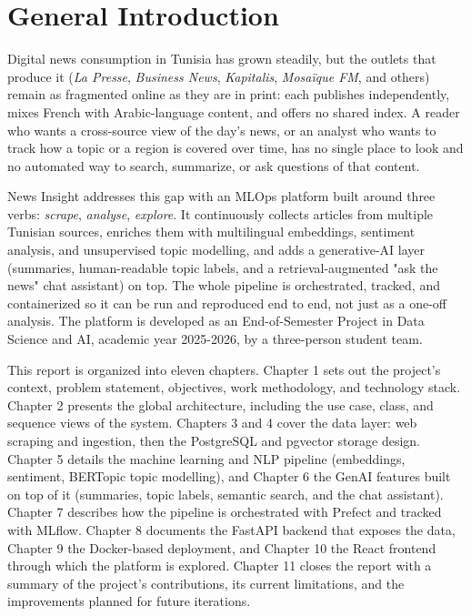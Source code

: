 \chapter*{General Introduction}

Digital news consumption in Tunisia has grown steadily, but the outlets that produce it (\textit{La Presse}, \textit{Business News}, \textit{Kapitalis}, \textit{Mosaïque FM}, and others) remain as fragmented online as they are in print: each publishes independently, mixes French with Arabic-language content, and offers no shared index. A reader who wants a cross-source view of the day's news, or an analyst who wants to track how a topic or a region is covered over time, has no single place to look and no automated way to search, summarize, or ask questions of that content.

News Insight addresses this gap with an MLOps platform built around three verbs: \emph{scrape}, \emph{analyse}, \emph{explore}. It continuously collects articles from multiple Tunisian sources, enriches them with multilingual embeddings, sentiment analysis, and unsupervised topic modelling, and adds a generative-AI layer (summaries, human-readable topic labels, and a retrieval-augmented "ask the news" chat assistant) on top. The whole pipeline is orchestrated, tracked, and containerized so it can be run and reproduced end to end, not just as a one-off analysis. The platform is developed as an End-of-Semester Project in Data Science and AI, academic year 2025-2026, by a three-person student team.

This report is organized into eleven chapters. Chapter 1 sets out the project's context, problem statement, objectives, work methodology, and technology stack. Chapter 2 presents the global architecture, including the use case, class, and sequence views of the system. Chapters 3 and 4 cover the data layer: web scraping and ingestion, then the PostgreSQL and pgvector storage design. Chapter 5 details the machine learning and NLP pipeline (embeddings, sentiment, BERTopic topic modelling), and Chapter 6 the GenAI features built on top of it (summaries, topic labels, semantic search, and the chat assistant). Chapter 7 describes how the pipeline is orchestrated with Prefect and tracked with MLflow. Chapter 8 documents the FastAPI backend that exposes the data, Chapter 9 the Docker-based deployment, and Chapter 10 the React frontend through which the platform is explored. Chapter 11 closes the report with a summary of the project's contributions, its current limitations, and the improvements planned for future iterations.